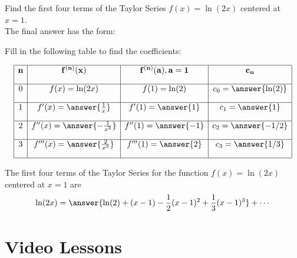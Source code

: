\documentclass{ximera}
\begin{document}
\begin{problem} Find the first four terms of the Taylor Series $f(x) = \ln(2x)$ centered at $x = 1$.\\


The final answer has the form:
\begin{center}
\begin{multipleChoice}
\end{multipleChoice}
\end{center}

Fill in the following table to find the coefficients:

\[
\begin{array}{|c|c|c|c|} 
\hline
\bf{n} & \bf{f^{(n)}(x)} & \bf{f^{(n)}(a), a = 1} & \bf{c_n} \\[1em] 
\hline
 0 & f(x) = \ln(2x) & f(1) = \ln(2) & c_0 = \answer{\ln(2)} \\[1em]
\hline
1 & f'(x) = \answer{\frac{1}{x}} & f'(1) = \answer{1} & c_1 = \answer{1} \\[1em]
\hline
 2 & f''(x) =\answer{-\frac{1}{x^2}} & f''(1) = \answer{-1} & c_2 = \answer{-1/2} \\[1em]
\hline
 3 & f'''(x) =\answer{\frac{2}{x^3}} & f'''(1) = \answer{2} & c_3 = \answer{1/3}\\[1em]
\hline
\end{array}
\]


The first four terms of the Taylor Series for the function $f(x) = \ln(2x)$ centered at $x = 1$ are
\[
\ln(2x) = \answer{\ln(2) + (x-1) -\frac12(x-1)^2 + \frac13(x-1)^3} + \cdots
\]


\end{problem}





\section{Video Lessons}

\begin{center}
\begin{foldable}
\end{foldable}
\end{center}



\begin{center}
\begin{foldable}
\end{foldable}
\end{center}
\end{document}
